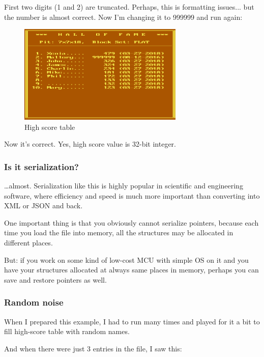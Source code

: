 First two digits (1 and 2) are truncated. Perhaps, this is formatting issues... but the number is almost correct.
Now I'm changing it to 999999 and run again:

\begin{figure}[H]
\centering
\includegraphics[width=0.7\textwidth]{advanced/550_more_structs/blockout/hs999999.png}
\caption{High score table}
\end{figure}

Now it's correct. Yes, high score value is 32-bit integer.

\subsubsection{Is it serialization?}

\dots almost.
Serialization like this is highly popular in scientific and engineering software, where efficiency and speed is much more important
than converting into \ac{XML} or \ac{JSON} and back.

One important thing is that you obviously cannot serialize pointers, because each time you load the file into memory,
all the structures may be allocated in different places.

But: if you work on some kind of low-cost \ac{MCU} with simple \ac{OS} on it
and you have your structures allocated at always same
places in memory, perhaps you can save and restore pointers as well.

\subsubsection{Random noise}

When I prepared this example, I had to run  many times and played for it a bit
to fill high-score table with random names.

And when there were just 3 entries in the file, I saw this:

